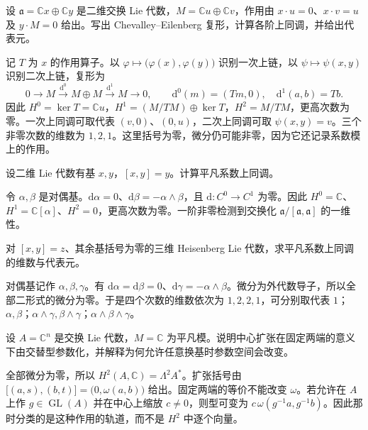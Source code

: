 \begin{optionalexercise}\label{b5:ex:20-one-dimensional-cohomology}
	设 \(\mathfrak a=\mathbb Cx\oplus\mathbb Cy\) 是二维交换 Lie 代数，\(M=\mathbb Cu\oplus\mathbb Cv\)，作用由 \(x\cdot u=0\)、\(x\cdot v=u\) 及 \(y\cdot M=0\) 给出。写出 Chevalley--Eilenberg 复形，计算各阶上同调，并给出代表元。
\end{optionalexercise}
\begin{solution}
	记 \(T\) 为 \(x\) 的作用算子。以 \(\varphi\mapsto\bigl(\varphi(x),\varphi(y)\bigr)\) 识别一次上链，以 \(\psi\mapsto\psi(x,y)\) 识别二次上链，复形为
	\[
		0\longrightarrow M\xrightarrow{\mathrm{d}^0}M\oplus M \xrightarrow{\mathrm{d}^1}M\longrightarrow0, \qquad \mathrm{d}^0(m)=(Tm,0),\quad \mathrm{d}^1(a,b)=Tb.
	\]
	因此 \(H^0=\ker T=\mathbb Cu\)，\(H^1=(M/TM)\oplus\ker T\)，\(H^2=M/TM\)，更高次数为零。一次上同调可取代表 \((v,0)\)、\((0,u)\)，二次上同调可取 \(\psi(x,y)=v\)。三个非零次数的维数为 \(1,2,1\)。这里括号为零，微分仍可能非零，因为它还记录系数模上的作用。
\end{solution}

\begin{optionalexercise}\label{b5:ex:20-affine-cohomology}
	设二维 Lie 代数有基 \(x,y\)，\([x,y]=y\)。计算平凡系数上同调。
\end{optionalexercise}
\begin{solution}
	令 \(\alpha,\beta\) 是对偶基。\(\mathrm{d}\alpha=0\)、\(\mathrm{d}\beta=-\alpha\wedge\beta\)，且 \(\mathrm{d}:C^0\to C^1\) 为零。因此 \(H^0=\mathbb C\)、\(H^1=\mathbb C[\alpha]\)、\(H^2=0\)，更高次数为零。一阶非零检测到交换化 \(\mathfrak a/[\mathfrak a,\mathfrak a]\) 的一维性。
\end{solution}

\begin{optionalexercise}\label{b5:ex:20-heisenberg-cohomology}
	对 \([x,y]=z\)、其余基括号为零的三维 Heisenberg Lie 代数，求平凡系数上同调的维数与代表元。
\end{optionalexercise}
\begin{solution}
	对偶基记作 \(\alpha,\beta,\gamma\)。有 \(\mathrm{d}\alpha=\mathrm{d}\beta=0\)、\(\mathrm{d}\gamma=-\alpha\wedge\beta\)。微分为外代数导子，所以全部二形式的微分为零。于是四个次数的维数依次为 \(1,2,2,1\)，可分别取代表 \(1\)；\(\alpha,\beta\)；\(\alpha\wedge\gamma,\beta\wedge\gamma\)；\(\alpha\wedge\beta\wedge\gamma\)。
\end{solution}

\begin{optionalexercise}\label{b5:ex:20-abelian-extension-classes}
	设 \(A=\mathbb C^n\) 是交换 Lie 代数，\(M=\mathbb C\) 为平凡模。说明中心扩张在固定两端的意义下由交替型参数化，并解释为何允许任意换基时参数空间会改变。
\end{optionalexercise}
\begin{solution}
	全部微分为零，所以 \(H^2(A,\mathbb C)=\Lambda^2 A^*\)。扩张括号由 \(\bigl[(a,s),(b,t)\bigr]=\bigl(0,\omega(a,b)\bigr)\) 给出。固定两端的等价不能改变 \(\omega\)。若允许在 \(A\) 上作 \(g\in\operatorname{GL}(A)\) 并在中心上缩放 \(c\ne0\)，则型可变为 \(c\,\omega(g^{-1}a,g^{-1}b)\)。因此那时分类的是这种作用的轨道，而不是 \(H^2\) 中逐个向量。
\end{solution}

